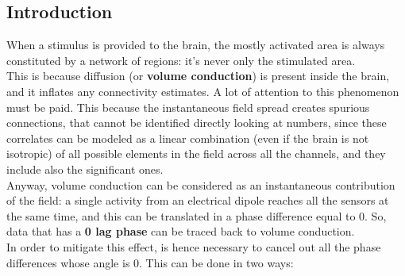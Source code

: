 \subsection{Introduction}
When a stimulus is provided to the brain, the mostly activated area is always constituted by a network of regions: it's never only the stimulated area.\\
This is because diffusion (or \textbf{volume conduction}) is present inside the brain, and it inflates any connectivity estimates. A lot of attention to this phenomenon must be paid. This because the instantaneous field spread creates spurious connections, that cannot be identified directly looking at numbers, since these correlates can be modeled as a linear combination (even if the brain is not isotropic) of all possible elements in the field across all the channels, and they include also the significant ones.\\
Anyway, volume conduction can be considered as an instantaneous contribution of the field: a single activity from an electrical dipole reaches all the sensors at the same time, and this can be translated in a phase difference equal to 0. 
So, data that has a \textbf{0 lag phase} can be traced back to volume conduction.\\
In order to mitigate this effect, is hence necessary to cancel out all the phase differences whose angle is 0. This can be done in two ways:
